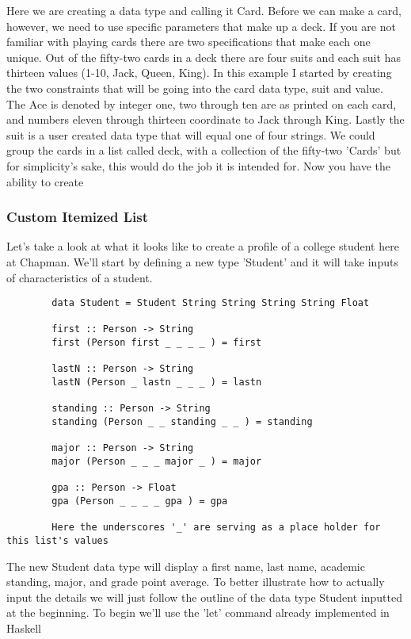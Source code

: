 \documentclass{article}
\begin{document}
    Here we are creating a data type and calling it Card. Before we can make a card, however, we need to use specific parameters that make up a deck. If you are not familiar with playing cards there are two specifications that make each one unique. Out of the fifty-two cards in a deck there are four suits and each suit has thirteen values (1-10, Jack, Queen, King). In this example I started by creating the two constraints that will be going into the card data type, suit and value. The Ace is denoted by integer one, two through ten are as printed on each card, and numbers eleven through thirteen coordinate to Jack through King. Lastly the suit is a user created data type that will equal one of four strings. We could group the cards in a list called deck, with a collection of the fifty-two 'Cards' but for simplicity's sake, this would do the job it is intended for. Now you have the ability to create
    
    \subsubsection{Custom Itemized List}
    Let's take a look at what it looks like to create a profile of a college student here at Chapman. We'll start by defining a new type 'Student' and it will take inputs of characteristics of a student.
    
    \medskip
    \begin{lstlisting}
        data Student = Student String String String String Float
        
        first :: Person -> String  
        first (Person first _ _ _ _ ) = first
          
        lastN :: Person -> String  
        lastN (Person _ lastn _ _ _ ) = lastn
          
        standing :: Person -> String  
        standing (Person _ _ standing _ _ ) = standing
          
        major :: Person -> String  
        major (Person _ _ _ major _ ) = major
          
        gpa :: Person -> Float  
        gpa (Person _ _ _ _ gpa ) = gpa
        
        Here the underscores '_' are serving as a place holder for this list's values
    \end{lstlisting}
    
    \noindent The new Student data type will display a first name, last name, academic standing, major, and grade point average. To better illustrate how to actually input the details we will just follow the outline of the data type Student inputted at the beginning. To begin we'll use the 'let' command already implemented in Haskell
    
\end{document}
